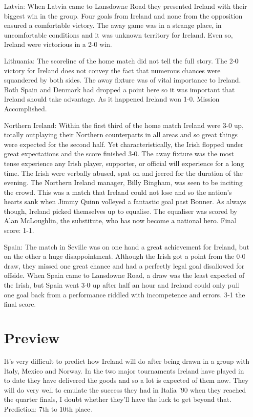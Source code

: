Latvia:  When Latvia came to Lansdowne Road they presented Ireland with their 
biggest win in the group. Four goals from Ireland and none from the 
opposition ensured a comfortable victory. The away game was in a 
strange place, in uncomfortable conditions and it was unknown 
territory for Ireland. Even so, Ireland were victorious in a 2-0 win.

Lithuania: The scoreline of the home match did not tell the full story. The 2-0
victory for Ireland does not convey the fact that numerous chances 
were squandered by both sides. The away fixture was of vital importance 
to Ireland. Both Spain and Denmark had dropped a point here so it was
important that Ireland should take advantage. As it happened Ireland 
won 1-0. Mission Accomplished.

Northern Ireland: Within the first third of the home match Ireland were 3-0 up, 
totally outplaying their Northern counterparts in all areas and so 
great things were expected for the second half. Yet characteristically,
the Irish flopped under great expectations and the score finished 3-0. 
The away fixture was the most tense experience any Irish player, 
supporter, or official will experience for a long time. The Irish were
verbally abused, spat on and jeered for the duration of the evening.
The Northern Ireland manager, Billy Bingham, was seen to be inciting 
the crowd. This was a match that Ireland could not lose and so the 
nation's hearts sank when Jimmy Quinn volleyed a fantastic goal past 
Bonner. As always though, Ireland picked themselves up to equalise. 
The equaliser was scored by Alan McLoughlin, the substitute, who has 
now become a national hero. Final score: 1-1.

Spain:   The match in Seville was on one hand a great achievement for Ireland,
but on the other a huge disappointment. Although the Irish got a point
from the 0-0 draw, they missed one great chance and had a perfectly 
legal goal disallowed for offside. When Spain came to Lansdowne Road, 
a draw was the least expected of the Irish, but Spain went 3-0 up 
after half an hour and Ireland could only pull one goal back from a 
performance riddled with incompetence and errors. 3-1 the final score.
\section{Preview}
It's very difficult to predict how Ireland will do after being drawn in a group
with Italy, Mexico and Norway. In the two major tournaments Ireland have played
in to date they have delivered the goods and so a lot is expected of them now.
They will do very well to emulate the success they had in Italia '90 when they
reached the quarter finals, I doubt whether they'll have the luck to get beyond
that. Prediction: 7th to 10th place.
